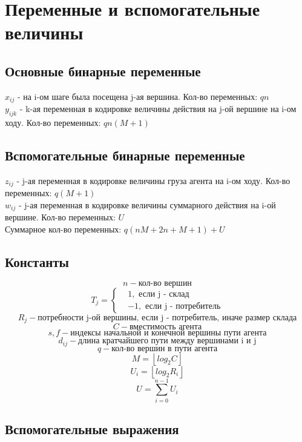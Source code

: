 \documentclass{article}
\begin{document}
\section{Переменные и вспомогательные величины}


\subsection{Основные бинарные переменные}
$x_{ij}$ - на i-ом шаге была посещена j-ая вершина. Кол-во переменных: \(qn\)\\
$y_{ijk}$ - k-ая переменная в кодировке величины действия на j-ой вершине на i-ом ходу. Кол-во переменных: \(qn(M + 1)\)\\

\subsection{Вспомогательные бинарные переменные}
$z_{ij}$ - j-ая переменная в кодировке величины груза агента на i-ом ходу. Кол-во переменных: \(q(M+1)\)\\
$w_{ij}$ - j-ая переменная в кодировке величины суммарного действия на i-ой вершине. Кол-во переменных: \(U\) \\

Суммарное кол-во переменных: \(q(nM + 2n + M + 1)+ U\)


\subsection{Константы}
\[n - \text{кол-во вершин}\]
\[T_{j} = \left\{
  \begin{aligned}
    & 1, \text{ если j - склад}
    \\
    & -1, \text{ если j - потребитель}
    \end{aligned}
\right.\]
\[R_{j} - \text{потребности j-ой вершины, если j - потребитель, иначе размер склада}\]
\[C - \text{вместимость агента}\]
\[s, f - \text{индексы начальной и конечной вершины пути агента}\]
\[d_{ij} - \text{длина кратчайшего пути между вершинами i и j}\]
\[q - \text{кол-во вершин в пути агента}\]
\[M = \left \lfloor{log_{2} C}\right \rfloor \]
\[U_{i} = \left \lfloor{log_{2} R_{i}}\right \rfloor \]
\[U = \sum_{i=0}^{n-1}U_{i}\]






\subsection{Вспомогательные выражения}
\end{document}
